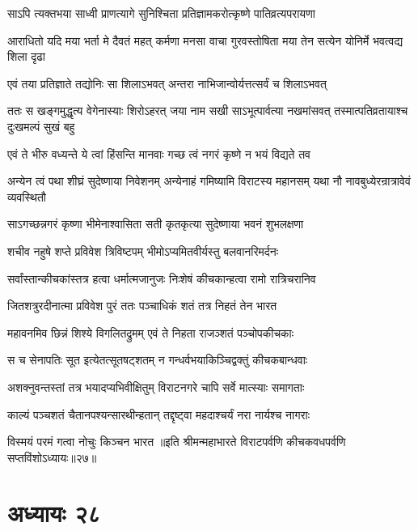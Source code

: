 \twolineshloka
{साऽपि त्यक्तभया साध्वी प्राणत्यागे सुनिश्चिता}
{प्रतिज्ञामकरोत्कृष्णे पातिव्रत्यपरायणा}


\threelineshloka
{आराधितो यदि मया भर्ता मे दैवतं महत्}
{कर्मणा मनसा वाचा गुरवस्तोषिता मया}
{तेन सत्येन योनिर्मे भवत्वद्य शिला दृढा}


\twolineshloka
{एवं तया प्रतिज्ञाते तद्योनिः सा शिलाऽभवत्}
{अन्तरा नाभिजान्वोर्यत्तत्सर्वं च शिलाऽभवत्}


\onelineshloka
{ततः स खङ्गमुद्धृत्य वेगेनास्याः शिरोऽहरत्}
\twolineshloka
{जया नाम सखी साऽभूत्पार्वत्या नखमांसवत्}
{तस्मात्पतिव्रतायाश्च दुःखमल्पं सुखं बहु}


\twolineshloka
{एवं ते भीरु वध्यन्ते ये त्वां हिंसन्ति मानवाः}
{गच्छ त्वं नगरं कृष्णे न भयं विद्यते तव}


\threelineshloka
{अन्येन त्वं पथा शीघ्रं सुदेष्णाया निवेशनम्}
{अन्येनाहं गमिष्यामि विराटस्य महानसम्}
{यथा नौ नावबुध्येरन्रात्रावेवं व्यवस्थितौ}



\twolineshloka
{साऽगच्छन्नगरं कृष्णा भीमेनाश्वासिता सती}
{कृतकृत्या सुदेष्णाया भवनं शुभलक्षणा}


\twolineshloka
{शचीव नहुषे शप्ते प्रविवेश त्रिविष्टपम्}
{भीमोऽप्यमितवीर्यस्तु बलवानरिमर्दनः}


\twolineshloka
{सर्वांस्तान्कीचकांस्तत्र हत्वा धर्मात्मजानुजः}
{निःशेषं कीचकान्हत्वा रामो रात्रिचरानिव}


\twolineshloka
{जितशत्रुरदीनात्मा प्रविवेश पुरं ततः}
{पञ्चाधिकं शतं तत्र निहतं तेन भारत}


\twolineshloka
{महावनमिव छिन्नं शिश्ये विगलितद्रुमम्}
{एवं ते निहता राजञ्शतं पञ्चोपकीचकाः}


\twolineshloka
{स च सेनापतिः सूत इत्येतत्सूतषट्शतम्}
{न गन्धर्वभयाकिञ्चिद्वक्तुं कीचकबान्धवाः}


\twolineshloka
{अशक्नुवन्तस्तां तत्र भयादप्यभिवीक्षितुम्}
{विराटनगरे चापि सर्वे मात्स्याः समागताः}


\twolineshloka
{काल्यं पञ्चशतं चैतानपश्यन्सारथीन्हतान्}
{तद्दृष्ट्वा महदाश्चर्यं नरा नार्यश्च नागराः}


\onelineshloka
{विस्मयं परमं गत्वा नोचुः किञ्चन भारत}
॥इति श्रीमन्महाभारते विराटपर्वणि कीचकवधपर्वणि सप्तविंशोऽध्यायः॥२७॥

\chapter{अध्यायः २८}

